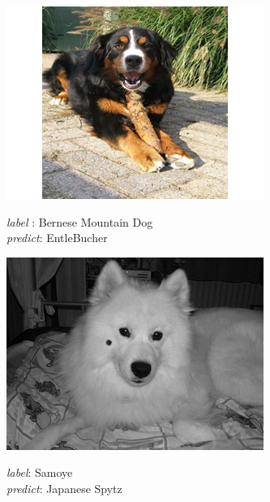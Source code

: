 \documentclass{article}
\begin{document}
\begin{figure}[h]
	\centering
	\label{fig:failures}
	\begin{subfigure}{0.32\linewidth}
		\centering
		\includegraphics[width=\linewidth]{pics/f1}
		\caption{ }
		\emph{label} : Bernese Mountain Dog \\ \emph{predict}: EntleBucher
		\label{fig:f1}
	\end{subfigure}
	\begin{subfigure}{0.32\linewidth}
		\centering
		\includegraphics[width=\linewidth]{pics/d1}
		\caption{ }
		\emph{label}: Samoye \\ \emph{predict}: Japanese Spytz
		\label{fig:d1}
	\end{subfigure}  

\end{figure}
\end{document}

